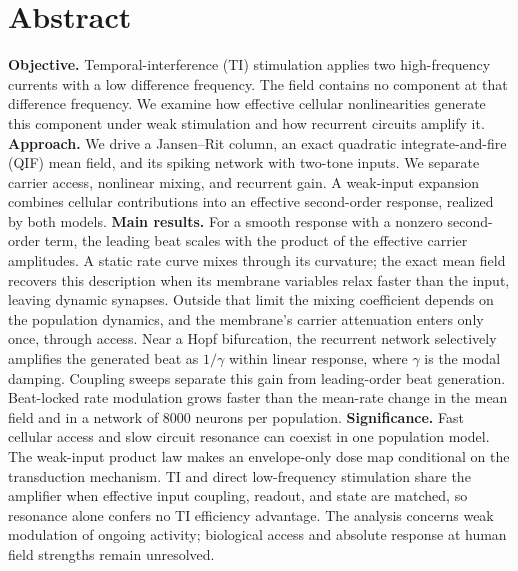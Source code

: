 \documentclass[11pt,a4paper]{article}
\newif\ifjne
\begin{document}
\section*{Abstract}
\ifjne
\noindent
\textbf{Objective.} Temporal-interference (TI) stimulation applies two high-frequency
currents with a low difference frequency. The field contains no component at that
difference frequency. We examine how effective cellular nonlinearities generate this
component under weak stimulation and how recurrent circuits amplify it.
\textbf{Approach.} We drive a Jansen--Rit column, an exact quadratic integrate-and-fire
(QIF) mean field, and its spiking network with two-tone inputs. We separate carrier
access, nonlinear mixing, and recurrent gain. A weak-input expansion combines cellular
contributions into an effective second-order response, realized by both models.
\textbf{Main results.} For a smooth response with a nonzero second-order term, the
leading beat scales with the product of the effective carrier amplitudes.
A static rate curve mixes through its curvature;
the exact mean field recovers this description when its membrane variables relax faster
than the input, leaving dynamic synapses. Outside that limit the mixing coefficient
depends on the population dynamics, and the membrane's carrier attenuation enters
only once, through access. Near a Hopf
bifurcation, the recurrent network selectively amplifies the generated beat as
$1/\gamma$ within linear response, where $\gamma$ is the modal damping. Coupling sweeps
separate this gain from leading-order beat generation. Beat-locked rate modulation
grows faster than the mean-rate change
in the mean field and in a network of $8000$ neurons per population.
\textbf{Significance.} Fast cellular access and slow circuit resonance can coexist in
one population model. The weak-input product law makes an envelope-only dose map
conditional on the transduction mechanism. TI and direct low-frequency stimulation
share the amplifier when effective input coupling, readout, and state are matched, so
resonance alone confers no TI efficiency advantage. The analysis concerns weak modulation of ongoing activity; biological access and
absolute response at human field strengths remain unresolved.
\end{document}
